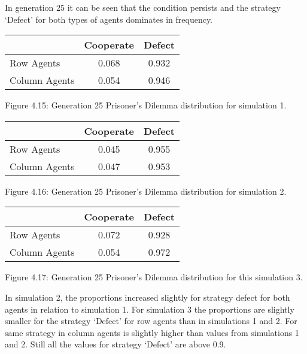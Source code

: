 \documentclass{article}
\begin{document}
In generation 25 it can be seen that the condition persists and the strategy `Defect' for both types of agents dominates in frequency.
\begin{center}
\begin{tabular}{|l|c|c|}
\hline
& Cooperate & Defect \\ 
\hline
Row Agents & 0.068 & 0.932\\
\hline
Column Agents & 0.054 & 0.946\\
\hline
\end{tabular}
\end{center}
\begin{center}
Figure 4.15: Generation 25 Prisoner’s Dilemma distribution for simulation 1.
\end{center}


\begin{center}
\begin{tabular}{|l|c|c|}
\hline
& Cooperate & Defect \\ 
\hline
Row Agents & 0.045 & 0.955\\
\hline
Column Agents & 0.047 & 0.953\\
\hline
\end{tabular}
\end{center}
\begin{center}
Figure 4.16: Generation 25 Prisoner’s Dilemma distribution for simulation 2.
\end{center}


\begin{center}
\begin{tabular}{|l|c|c|}
\hline
& Cooperate & Defect \\ 
\hline
Row Agents & 0.072 & 0.928\\
\hline
Column Agents & 0.054 & 0.972\\
\hline
\end{tabular}
\end{center}
\begin{center}
Figure 4.17: Generation 25 Prisoner’s Dilemma distribution for this simulation 3.
\end{center}

In simulation 2, the proportions increased slightly for strategy defect for both agents in relation to simulation 1. For simulation 3 the proportions are slightly smaller for the strategy `Defect' for row agents than in simulations 1 and 2. For same strategy in column agents is slightly higher than values from simulations 1 and 2. Still all the values for strategy `Defect' are above 0.9.
\end{document}
